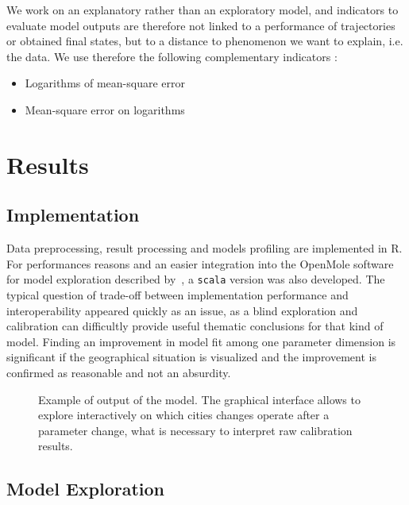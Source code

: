 \documentclass[Royal,sageh,times]{sagej}
\begin{document}
We work on an explanatory rather than an exploratory model, and indicators to evaluate model outputs are therefore not linked to a performance of trajectories or obtained final states, but to a distance to phenomenon we want to explain, i.e. the data. We use therefore the following complementary indicators :

\begin{itemize}
\item Logarithms of mean-square error
\item Mean-square error on logarithms
\end{itemize}







\section{Results}



\subsection{Implementation}

Data preprocessing, result processing and models profiling are implemented in R. For performances reasons and an easier integration into the OpenMole software for model exploration described by~\cite{reuillon2013openmole}, a \texttt{scala} version was also developed. The typical question of trade-off between implementation performance and interoperability appeared quickly as an issue, as a blind exploration and calibration can difficultly provide useful thematic conclusions for that kind of model. Finding an improvement in model fit among one parameter dimension is significant if the geographical situation is visualized and the improvement is confirmed as reasonable and not an absurdity.


\begin{figure}
\centering
\caption{Example of output of the model. The graphical interface allows to explore interactively on which cities changes operate after a parameter change, what is necessary to interpret raw calibration results.}
\end{figure}




\subsection{Model Exploration}
\end{document}
